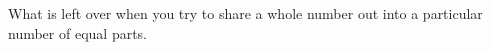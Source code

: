 What is left over when you try to share a whole 
number out into a particular number of equal parts.